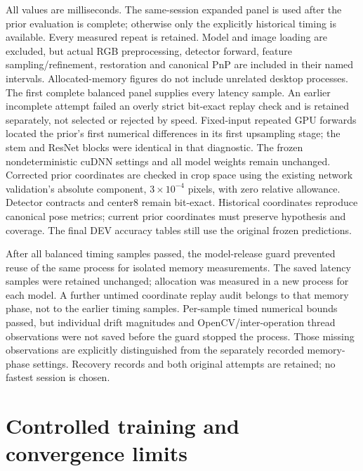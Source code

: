 \documentclass[10pt]{article}
\begin{document}
All values are milliseconds. The same-session expanded panel is used after the prior evaluation is complete; otherwise only the explicitly historical timing is available. Every measured repeat is retained. Model and image loading are excluded, but actual RGB preprocessing, detector forward, feature sampling/refinement, restoration and canonical PnP are included in their named intervals. Allocated-memory figures do not include unrelated desktop processes.
\small\normalsize
The first complete balanced panel supplies every latency sample. An earlier incomplete attempt failed an overly strict bit-exact replay check and is retained separately, not selected or rejected by speed. Fixed-input repeated GPU forwards located the prior's first numerical differences in its first upsampling stage; the stem and ResNet blocks were identical in that diagnostic. The frozen nondeterministic cuDNN settings and all model weights remain unchanged. Corrected prior coordinates are checked in crop space using the existing network validation's absolute component, $3\times10^{-4}$ pixels, with zero relative allowance. Detector contracts and center8 remain bit-exact. Historical coordinates reproduce canonical pose metrics; current prior coordinates must preserve hypothesis and coverage. The final DEV accuracy tables still use the original frozen predictions.

After all balanced timing samples passed, the model-release guard prevented reuse of the same process for isolated memory measurements. The saved latency samples were retained unchanged; allocation was measured in a new process for each model. A further untimed coordinate replay audit belongs to that memory phase, not to the earlier timing samples. Per-sample timed numerical bounds passed, but individual drift magnitudes and OpenCV/inter-operation thread observations were not saved before the guard stopped the process. Those missing observations are explicitly distinguished from the separately recorded memory-phase settings. Recovery records and both original attempts are retained; no fastest session is chosen.
\section{Controlled training and convergence limits}
\end{document}
